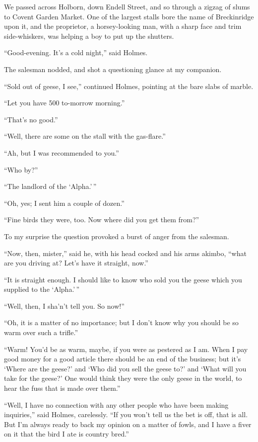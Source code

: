 We passed across Holborn, down Endell Street, and so
through a zigzag of slums to Covent Garden Market. One
of the largest stalls bore the name of Breckinridge upon it,
and the proprietor, a horsey-looking man, with a sharp face
and trim side-whiskers, was helping a boy to put up the
shutters.

“Good-evening. It’s a cold night,” said Holmes.

The salesman nodded, and shot a questioning glance at my
companion.

“Sold out of geese, I see,” continued Holmes, pointing at
the bare slabs of marble.

“Let you have 500 to-morrow morning.”

“That’s no good.”

“Well, there are some on the stall with the gas-flare.”

“Ah, but I was recommended to you.”

“Who by?”

“The landlord of the ‘Alpha.’\,”

“Oh, yes; I sent him a couple of dozen.”

“Fine birds they were, too. Now where did you get them
from?”

To my surprise the question provoked a burst of anger
from the salesman.

“Now, then, mister,” said he, with his head cocked and his
arms akimbo, “what are you driving at? Let’s have it
straight, now.”

“It is straight enough. I should like to know who sold
you the geese which you supplied to the ‘Alpha.’\,”

“Well, then, I sha’n’t tell you. So now!”

“Oh, it is a matter of no importance; but I don’t know
why you should be so warm over such a trifle.”

“Warm! You’d be as warm, maybe, if you were as pester\-ed
as I am. When I pay good money for a good article
there should be an end of the business; but it’s ‘Where are
the geese?’ and ‘Who did you sell the geese to?’ and ‘What will
you take for the geese?’ One would think they were the only
geese in the world, to hear the fuss that is made over them.”

“Well, I have no connection with any other people who
have been making inquiries,” said Holmes, carelessly. “If
you won’t tell us the bet is off, that is all. But I’m always
ready to back my opinion on a matter of fowls, and I have a
fiver on it that the bird I ate is country bred.”

